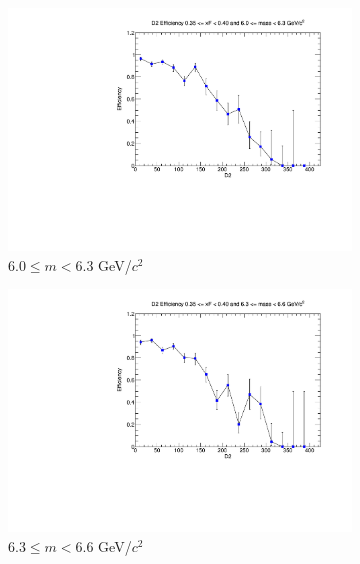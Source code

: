 \documentclass[11pt]{article}
\begin{document}
\begin{figure}[p]
\begin{subfigure}[b]{0.32\textwidth}
        \includegraphics[width=\textwidth]{./kTrackerEfficiencyPlots/D2_Efficiency_xF7_mass6.pdf}
        \caption{$6.0 \leq m < 6.3$ GeV/$c^2$}
    \end{subfigure}\hfill
    \begin{subfigure}[b]{0.32\textwidth}
        \centering
        \includegraphics[width=\textwidth]{./kTrackerEfficiencyPlots/D2_Efficiency_xF7_mass7.pdf}
        \caption{$6.3 \leq m < 6.6$ GeV/$c^2$}
    \end{subfigure}\hfill
    \begin{subfigure}[b]{0.32\textwidth}
        \centering

\end{subfigure}
\end{figure}
\end{document}
